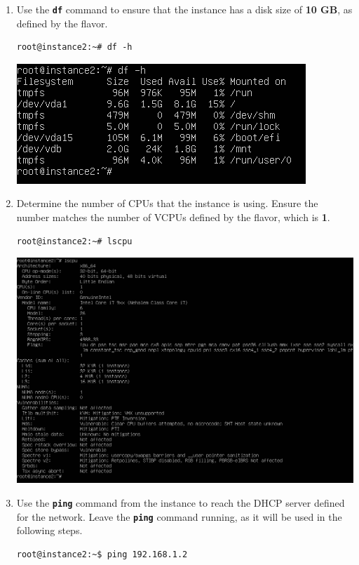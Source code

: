 \documentclass[letterpaper, 12pt]{article}
\begin{document}
\begin{enumerate}
    \item Use the \textbf{\texttt{df}} command to ensure that the instance has a disk size of \textbf{10 GB}, as defined
    by the flavor.
\begin{lstlisting}
root@instance2:~# df -h
\end{lstlisting}

    \begin{center}
        \includegraphics[width=\linewidth]{images/part5/step8.png}
    \end{center}

    \item Determine the number of CPUs that the instance is using. Ensure the number matches the number of VCPUs defined
    by the flavor, which is \textbf{1}.
\begin{lstlisting}
root@instance2:~# lscpu
\end{lstlisting}

    \begin{center}
        \includegraphics[width=\linewidth]{images/part5/step9.png}
    \end{center}

    \item Use the \textbf{\texttt{ping}} command from the instance to reach the DHCP server defined for the network.
    Leave the \textbf{\texttt{ping}} command running, as it will be used in the following steps.
\begin{lstlisting}
root@instance2:~$ ping 192.168.1.2
\end{lstlisting}


\end{enumerate}
\end{document}
